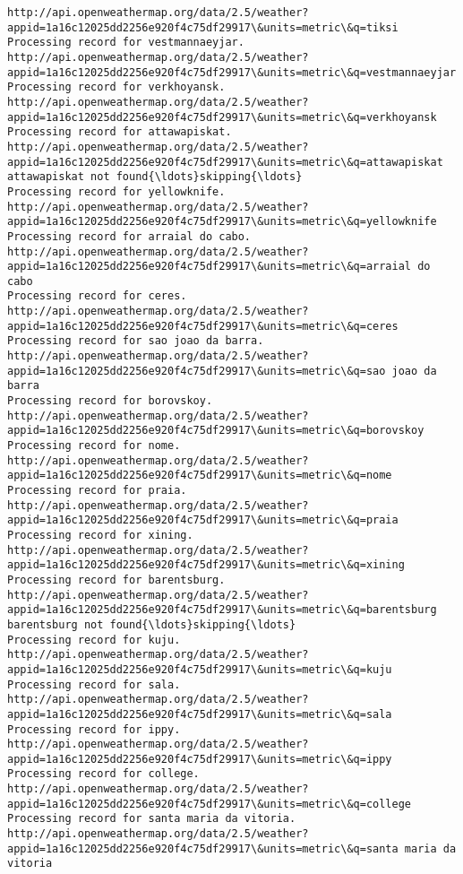 \documentclass[11pt]{article}
\begin{document}
\begin{Verbatim}[commandchars=\\\{\}]
http://api.openweathermap.org/data/2.5/weather?appid=1a16c12025dd2256e920f4c75df29917\&units=metric\&q=tiksi
Processing record for vestmannaeyjar.
http://api.openweathermap.org/data/2.5/weather?appid=1a16c12025dd2256e920f4c75df29917\&units=metric\&q=vestmannaeyjar
Processing record for verkhoyansk.
http://api.openweathermap.org/data/2.5/weather?appid=1a16c12025dd2256e920f4c75df29917\&units=metric\&q=verkhoyansk
Processing record for attawapiskat.
http://api.openweathermap.org/data/2.5/weather?appid=1a16c12025dd2256e920f4c75df29917\&units=metric\&q=attawapiskat
attawapiskat not found{\ldots}skipping{\ldots}
Processing record for yellowknife.
http://api.openweathermap.org/data/2.5/weather?appid=1a16c12025dd2256e920f4c75df29917\&units=metric\&q=yellowknife
Processing record for arraial do cabo.
http://api.openweathermap.org/data/2.5/weather?appid=1a16c12025dd2256e920f4c75df29917\&units=metric\&q=arraial do cabo
Processing record for ceres.
http://api.openweathermap.org/data/2.5/weather?appid=1a16c12025dd2256e920f4c75df29917\&units=metric\&q=ceres
Processing record for sao joao da barra.
http://api.openweathermap.org/data/2.5/weather?appid=1a16c12025dd2256e920f4c75df29917\&units=metric\&q=sao joao da barra
Processing record for borovskoy.
http://api.openweathermap.org/data/2.5/weather?appid=1a16c12025dd2256e920f4c75df29917\&units=metric\&q=borovskoy
Processing record for nome.
http://api.openweathermap.org/data/2.5/weather?appid=1a16c12025dd2256e920f4c75df29917\&units=metric\&q=nome
Processing record for praia.
http://api.openweathermap.org/data/2.5/weather?appid=1a16c12025dd2256e920f4c75df29917\&units=metric\&q=praia
Processing record for xining.
http://api.openweathermap.org/data/2.5/weather?appid=1a16c12025dd2256e920f4c75df29917\&units=metric\&q=xining
Processing record for barentsburg.
http://api.openweathermap.org/data/2.5/weather?appid=1a16c12025dd2256e920f4c75df29917\&units=metric\&q=barentsburg
barentsburg not found{\ldots}skipping{\ldots}
Processing record for kuju.
http://api.openweathermap.org/data/2.5/weather?appid=1a16c12025dd2256e920f4c75df29917\&units=metric\&q=kuju
Processing record for sala.
http://api.openweathermap.org/data/2.5/weather?appid=1a16c12025dd2256e920f4c75df29917\&units=metric\&q=sala
Processing record for ippy.
http://api.openweathermap.org/data/2.5/weather?appid=1a16c12025dd2256e920f4c75df29917\&units=metric\&q=ippy
Processing record for college.
http://api.openweathermap.org/data/2.5/weather?appid=1a16c12025dd2256e920f4c75df29917\&units=metric\&q=college
Processing record for santa maria da vitoria.
http://api.openweathermap.org/data/2.5/weather?appid=1a16c12025dd2256e920f4c75df29917\&units=metric\&q=santa maria da vitoria

\end{Verbatim}
\end{document}
